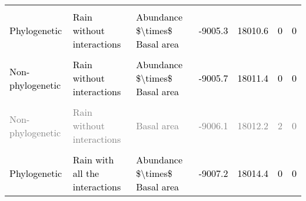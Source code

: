 \documentclass[
  12pt,
  letterpaper,
  DIV=11,
  numbers=noendperiod]{scrartcl}
\begin{document}
\begin{table}[H]
{\begin{tabular}[t]{lllllll}
\cellcolor{gray!6}{\textcolor{gray}{Non-phylogenetic}} & \cellcolor{gray!6}{\textcolor{gray}{Rain with all the interactions}} & \cellcolor{gray!6}{\textcolor{gray}{Abundance \$\textbackslash{}times\$ Basal area}} & \cellcolor{gray!6}{\textcolor{gray}{-9005.0}} & \cellcolor{gray!6}{\textcolor{gray}{18010.1}} & \cellcolor{gray!6}{\textcolor{gray}{2}} & \cellcolor{gray!6}{\textcolor{gray}{0}}\\
\textcolor{black}{Phylogenetic} & \textcolor{black}{Rain without interactions} & \textcolor{black}{Abundance \$\textbackslash{}times\$ Basal area} & \textcolor{black}{-9005.3} & \textcolor{black}{18010.6} & \textcolor{black}{0} & \textcolor{black}{0}\\
\cellcolor{gray!6}{\textcolor{gray}{Non-phylogenetic}} & \cellcolor{gray!6}{\textcolor{gray}{Rain without interactions}} & \cellcolor{gray!6}{\textcolor{gray}{Abundance}} & \cellcolor{gray!6}{\textcolor{gray}{-9005.4}} & \cellcolor{gray!6}{\textcolor{gray}{18010.7}} & \cellcolor{gray!6}{\textcolor{gray}{2}} & \cellcolor{gray!6}{\textcolor{gray}{0}}\\
\textcolor{black}{Non-phylogenetic} & \textcolor{black}{Rain without interactions} & \textcolor{black}{Abundance \$\textbackslash{}times\$ Basal area} & \textcolor{black}{-9005.7} & \textcolor{black}{18011.4} & \textcolor{black}{0} & \textcolor{black}{0}\\
\addlinespace
\cellcolor{gray!6}{\textcolor{black}{Phylogenetic}} & \cellcolor{gray!6}{\textcolor{black}{Rain without interactions}} & \cellcolor{gray!6}{\textcolor{black}{Abundance}} & \cellcolor{gray!6}{\textcolor{black}{-9005.8}} & \cellcolor{gray!6}{\textcolor{black}{18011.6}} & \cellcolor{gray!6}{\textcolor{black}{0}} & \cellcolor{gray!6}{\textcolor{black}{0}}\\
\textcolor{gray}{Non-phylogenetic} & \textcolor{gray}{Rain without interactions} & \textcolor{gray}{Basal area} & \textcolor{gray}{-9006.1} & \textcolor{gray}{18012.2} & \textcolor{gray}{2} & \textcolor{gray}{0}\\
\cellcolor{gray!6}{\textcolor{black}{Phylogenetic}} & \cellcolor{gray!6}{\textcolor{black}{Rain without interactions}} & \cellcolor{gray!6}{\textcolor{black}{Basal area}} & \cellcolor{gray!6}{\textcolor{black}{-9006.9}} & \cellcolor{gray!6}{\textcolor{black}{18013.8}} & \cellcolor{gray!6}{\textcolor{black}{0}} & \cellcolor{gray!6}{\textcolor{black}{0}}\\
\textcolor{black}{Phylogenetic} & \textcolor{black}{Rain with all the interactions} & \textcolor{black}{Abundance \$\textbackslash{}times\$ Basal area} & \textcolor{black}{-9007.2} & \textcolor{black}{18014.4} & \textcolor{black}{0} & \textcolor{black}{0}\\

\end{tabular}}
\end{table}
\end{document}
